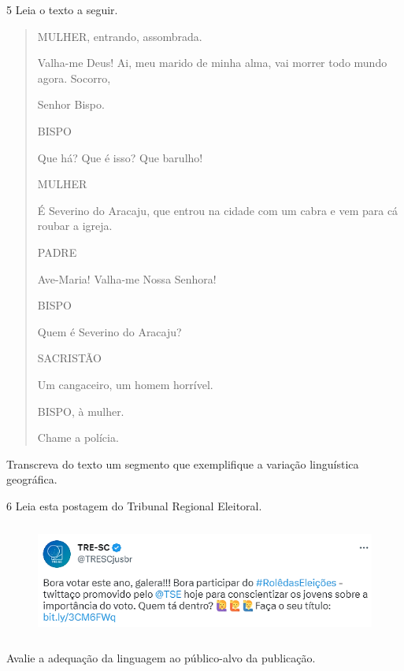 \num{5} Leia o texto a seguir.

\begin{quote}

MULHER, entrando, assombrada.

Valha-me Deus! Ai, meu marido de minha alma, vai morrer todo mundo
agora. Socorro,

Senhor Bispo.

BISPO

Que há? Que é isso? Que barulho!

MULHER

É Severino do Aracaju, que entrou na cidade com um cabra e vem para cá
roubar a igreja.

PADRE

Ave-Maria! Valha-me Nossa Senhora!

BISPO

Quem é Severino do Aracaju?

SACRISTÃO

Um cangaceiro, um homem horrível.

BISPO, à mulher.

Chame a polícia.
\end{quote}


Transcreva do texto um segmento que exemplifique a variação linguística
geográfica.



\num{6} Leia esta postagem do Tribunal Regional Eleitoral.

\begin{figure}[H]
\centering
\includegraphics[width=5.26042in,height=1.47161in]{./imgSAEB_8_POR/media/image27.png}
\end{figure}

Avalie a adequação da linguagem ao público-alvo da publicação.


